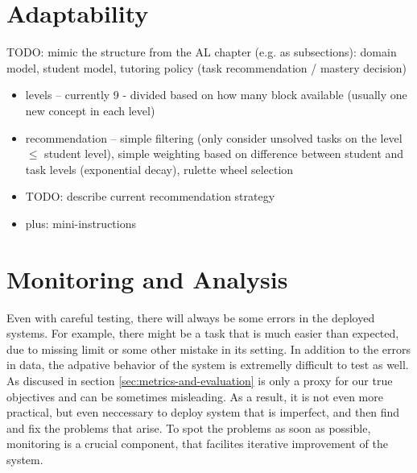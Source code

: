 \section{Adaptability}
\label{sec:robomission.adaptability}

TODO: mimic the structure from the AL chapter (e.g. as subsections):
domain model, student model, tutoring policy (task recommendation / mastery decision)

\begin{itemize}
\item levels -- currently 9 - divided based on how many block available (usually one new concept in each level)
\item recommendation -- simple filtering (only consider unsolved tasks on the level $\leq$ student level), simple weighting based on difference between student and task levels (exponential decay), rulette wheel selection
\item TODO: describe current recommendation strategy
\item plus: mini-instructions
\end{itemize}





\section{Monitoring and Analysis}
\label{sec:robomission.monitoring}

Even with careful testing, there will always be some errors in the deployed systems.
For example, there might be a task that is much easier than expected,
due to missing limit or some other mistake in its setting.
In addition to the errors in data,  %
the adpative behavior of the system is extremelly difficult to test as well.
As discused in section \ref{sec:metrics-and-evaluation} is only a proxy for our true objectives
and can be sometimes misleading.
As a result, it is not even more practical, but even neccessary to deploy system
that is imperfect, and then find and fix the problems that arise.
To spot the problems as soon as possible,
monitoring is a crucial component,
that facilites iterative improvement of the system.

